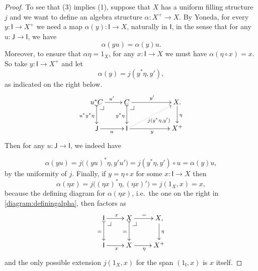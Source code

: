 \documentclass[11pt,reqno]{amsart}
\makeatletter
\newcommand{\rep}[1]{\ensuremath{\mathsf{#1}}}%
\newcommand{\ra}{\ensuremath{\rightarrow}}
\theoremstyle{remark}
\theoremstyle{definition}
\newcommand{\pbcorner}[1][dr]{\save*!/#1-1.2pc/#1:(-1,1)@^{|-}\restore}
\makeatother
\begin{document}
\begin{proof}
To see that (3) implies (1), suppose that $X$ has a uniform filling structure $j$ and we want to define an algebra structure $\alpha : X^+ \ra X$. By Yoneda, for every $y : \rep{I} \ra X^+$ we need a map $\alpha(y) : \rep{I} \ra X$, naturally in $\rep{I}$, in the sense that for any $u : \rep{J} \ra \rep{I}$, we have
\begin{equation}\label{eq:proof,plusstructure}
\alpha(yu) = \alpha(y)u.
\end{equation}
Moreover, to ensure that $\alpha\eta = 1_X$, for any $x : \rep{I} \ra X$ we must have $\alpha(\eta\circ x) = x$. So take $y : \rep{I} \ra X^+$  and let 
\[
\alpha(y) = j(y^*\eta, y'),
\]
as indicated on the right below.
\begin{equation}\label{diagram:definingalpha}
\xymatrix{
u^*C \ar@{>->}[d]_{u^*y^*\eta} \ar[r]^{u'} \pbcorner &  C \ar@{>->}[d]_{y^*\eta} \ar[rr]^{y'}\pbcorner && X \ar[d]^\eta . \\
\rep{J} \ar[r]_{u} & \rep{I} \ar@{.>}[rru]_{j(y^*\eta,y')} \ar[rr]_{y} && X^+
}
\end{equation}
Then for any $u : \rep{J} \ra \rep{I}$, we indeed have 

\[
\alpha(yu) =  j\big( (yu)^*\eta, y'u' \big) = j(y^*\eta, y')\circ u = \alpha(y)u,
\]
 by the uniformity of $j$. Finally, if $y=\eta\circ x$ for some $x : \rep{I}\ra X$ then 
 \[
 \alpha(\eta x) =  j\big( (\eta x)^*\eta, (\eta x)'\big) = j(1_X, x) = x,
 \]
 because the defining diagram for $\alpha(\eta x)$, i.e.\ the one on the right in \eqref{diagram:definingalpha}, then factors as
 \begin{equation}\label{diagram:definingalphatwo}
\xymatrix{
\rep{I} \ar@{>->}[d]_{=} \ar[r]^{x} \pbcorner &  X \ar@{>->}[d]_{=} \ar[r]^{=}\pbcorner & X \ar[d]^\eta , \\
\rep{I} \ar[r]_{x} & X  \ar[r]_{\eta} & X^+
}
\end{equation}
and the only possible extension $j(1_X, x)$ for the span $(1_{\rep{I}}, x)$ is  $x$ itself.
 \end{proof}
 
\end{document}

